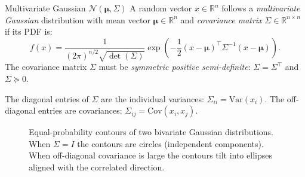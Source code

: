 \begin{defnbox}{Multivariate Gaussian $\mathcal{N}(\boldsymbol{\mu}, \Sigma)$}
A random vector $x \in \mathbb{R}^n$ follows a
\emph{multivariate Gaussian} distribution with mean vector
$\boldsymbol{\mu} \in \mathbb{R}^n$ and
\emph{covariance matrix} $\Sigma \in \mathbb{R}^{n\times n}$ if its
PDF is:
\[
  f(x) = \frac{1}{(2\pi)^{n/2}\sqrt{\det(\Sigma)}}
                  \exp\!\left(-\frac{1}{2}
                  (x-\boldsymbol{\mu})^\top
                  \Sigma^{-1}
                  (x-\boldsymbol{\mu})\right).
\]
The covariance matrix $\Sigma$ must be \emph{symmetric positive
semi-definite}: $\Sigma = \Sigma^\top$ and $\Sigma \succeq 0$.
\end{defnbox}

The diagonal entries of $\Sigma$ are the individual variances:
$\Sigma_{ii} = \mathrm{Var}(x_i)$.  The off-diagonal entries are
covariances: $\Sigma_{ij} = \mathrm{Cov}(x_i, x_j)$.

\begin{figure}[htbp]
\centering
{}
\caption{Equal-probability contours of two bivariate Gaussian
  distributions.  When $\Sigma = I$ the contours are circles
  (independent components).  When off-diagonal covariance is large the
  contours tilt into ellipses aligned with the correlated direction.}
\label{fig:bivariate_gauss}
\end{figure}

